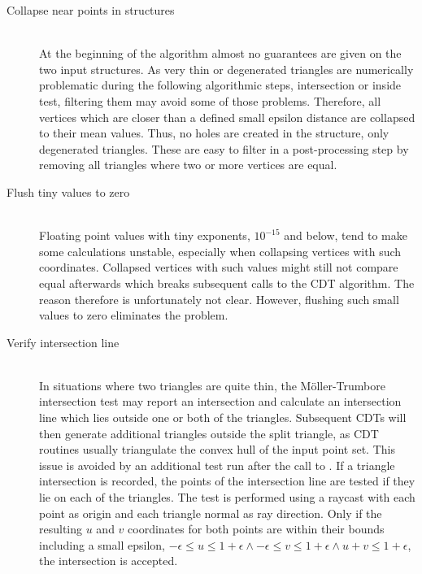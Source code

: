 \begin{description}

	\item[Collapse near points in structures] \hfill \\
	At the beginning of the  algorithm almost no guarantees are given on the two input structures.
	As very thin or degenerated triangles are numerically problematic during the following algorithmic steps, \eg intersection or inside test, filtering them may avoid some of those problems.
	Therefore, all vertices which are closer than a defined small epsilon distance are collapsed to their mean values.
	Thus, no holes are created in the structure, only degenerated triangles.
	These are easy to filter in a post-processing step by removing all triangles where two or more vertices are equal.


	\item[Flush tiny values to zero] \hfill \\
	Floating point values with tiny exponents, \eg $10^{-15}$ and below, tend to make some calculations unstable, especially when collapsing vertices with such coordinates.
	Collapsed vertices with such values might still not compare equal afterwards which breaks subsequent calls to the CDT algorithm.
	The reason therefore is unfortunately not clear.
	However, flushing such small values to zero eliminates the problem.


	\item[Verify intersection line] \hfill \\
	In situations where two triangles are quite thin, the Möller-Trumbore intersection test may report an intersection and calculate an intersection line which lies outside one or both of the triangles.
	Subsequent CDTs will then generate additional triangles outside the split triangle, as CDT routines usually triangulate the convex hull of the input point set.
	This issue is avoided by an additional test run after the call to .
	If a triangle intersection is recorded, the points of the intersection line are tested if they lie on each of the triangles.
	The test is performed using a raycast with each point as origin and each triangle normal as ray direction.
	Only if the resulting $u$ and $v$ coordinates for both points are within their bounds including a small epsilon, \ie $-\epsilon \leq u \leq 1+\epsilon \wedge -\epsilon \leq v \leq 1+\epsilon \wedge u + v \leq 1 + \epsilon$, the intersection is accepted.



\end{description}
